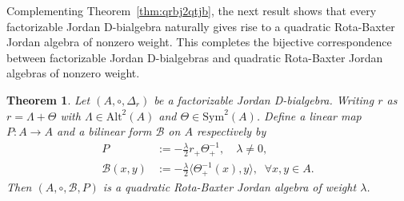 \documentclass[12pt, reqno, a4paper]{amsart}
\newtheorem{theorem}{Theorem}[section]
\theoremstyle{definition}
\begin{document}
Complementing Theorem~\ref{thm:qrbj2qtjb}, the next result shows that every factorizable Jordan D-bialgebra naturally gives rise to a quadratic Rota-Baxter Jordan algebra of nonzero weight.
This completes the bijective correspondence between factorizable Jordan D-bialgebras and quadratic Rota-Baxter Jordan algebras of nonzero weight.


\begin{theorem}\label{thm:fpb2qrp}
	Let $(A, \circ ,\Delta_r)$ be a factorizable Jordan D-bialgebra.  
	Writing $r$ as $r = \Lambda + \Theta$ with $\Lambda \in \mathrm{Alt}^2(A)$ and $\Theta \in \mathrm{Sym}^2(A)$.
	Define a linear map $P: A \to A$ and a bilinear form $\mathcal{B}$ on $A$ respectively by
	\begin{align*}
		P & := -\frac{\lambda}{2} r_{+}  \Theta_{+}^{-1} , \quad \lambda \neq 0, \\
		\mathcal{B}(x, y) & := -\frac{\lambda}{2}\langle \Theta_{+}^{-1} (x) , y \rangle, \;\; \forall x, y \in A.
	\end{align*}
	Then $( A, \circ, \mathcal{B}, P)$ is a quadratic Rota-Baxter Jordan algebra of weight $\lambda$.
\end{theorem}
\end{document}
